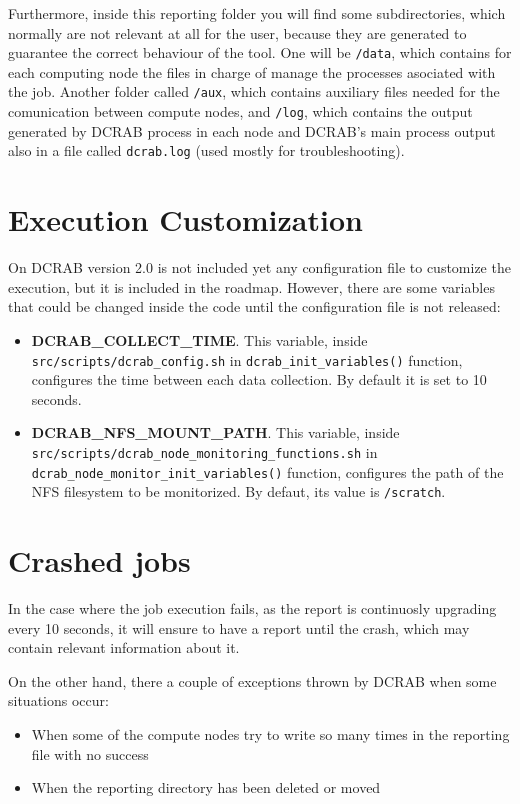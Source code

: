 \documentclass[10pt,a4paper]{report}
\begin{document}
Furthermore, inside this reporting folder you will find some subdirectories, which normally are not relevant at all for the user, because they are generated to guarantee the correct behaviour of the tool. One will be \verb+/data+, which contains for each computing node the files in charge of manage the processes asociated with the job. Another folder called \verb+/aux+, which contains auxiliary files needed for the comunication between compute nodes, and \verb+/log+, which contains the output generated by DCRAB process in each node and DCRAB's main process output also in a file called \verb+dcrab.log+ (used mostly for troubleshooting).

\section{Execution Customization}

On DCRAB version 2.0 is not included yet any configuration file to customize the execution, but it is included in the roadmap. However, there are some variables that could be changed inside the code until the configuration file is not released:

\begin{itemize}
	\item \textbf{DCRAB\_COLLECT\_TIME}. This variable, inside \verb+src/scripts/dcrab_config.sh+ in \verb+dcrab_init_variables()+ function, configures the time between each data collection. By default it is set to 10 seconds.
	\item \textbf{DCRAB\_NFS\_MOUNT\_PATH}. This variable, inside \verb+src/scripts/dcrab_node_monitoring_functions.sh+ in \verb+dcrab_node_monitor_init_variables()+ function, configures the path of the NFS filesystem to be monitorized. By defaut, its value is \verb+/scratch+.
\end{itemize}

\section{Crashed jobs}
In the case where the job execution fails, as the report is continuosly upgrading every 10 seconds, it will ensure to have a report until the crash, which may contain relevant information about it.

On the other hand, there a couple of exceptions thrown by DCRAB when some situations occur:

\begin{itemize}
	\item When some of the compute nodes try to write so many times in the reporting file with no success
	\item When the reporting directory has been deleted or moved
\end{itemize}
\end{document}
